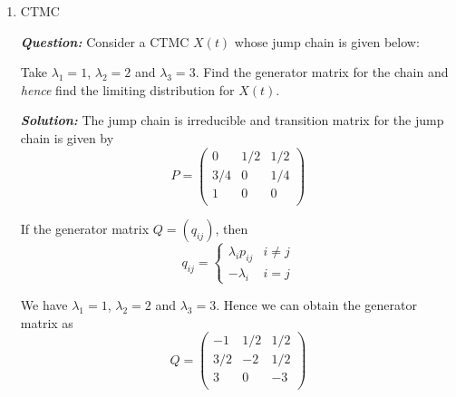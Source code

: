 \documentclass[12pt, oneside]{article}
\begin{document}
\begin{enumerate}
\begin{enumerate}[label=(\alph*)]
\end{enumerate}

\newpage
\item CTMC

\textbf{\textit{Question:}}
Consider a CTMC $X(t)$ whose jump chain is given below:

        \begin{figure}[!h]
        \centering
        \end{figure}
Take $\lambda_1 = 1$, $\lambda_2 = 2$ and $\lambda_3 = 3$. Find the generator matrix for the chain and \textit{hence} find the limiting distribution for $X(t)$.

\textbf{\textit{Solution:}}
The jump chain is irreducible and transition matrix for the jump chain is given by 
\[ P = 
\begin{pmatrix}
0       & 1/2   & 1/2    \\
3/4     & 0     & 1/4    \\
1       & 0     & 0      \\
\end{pmatrix}
\]

If the generator matrix $Q=(q_{ij})$, then 
\[ q_{ij}=
\begin{cases}
\lambda_i p_{ij} & i \ne j \\
- \lambda_i & i=j
\end{cases}
\]

We have $\lambda_1 = 1$, $\lambda_2 = 2$ and $\lambda_3 = 3$. Hence we can obtain the generator matrix as 
\[ Q = 
\begin{pmatrix}
-1      & 1/2   & 1/2    \\
3/2     & -2    & 1/2    \\
3       & 0     & -3      \\
\end{pmatrix}
\]


\end{enumerate}
\end{document}
